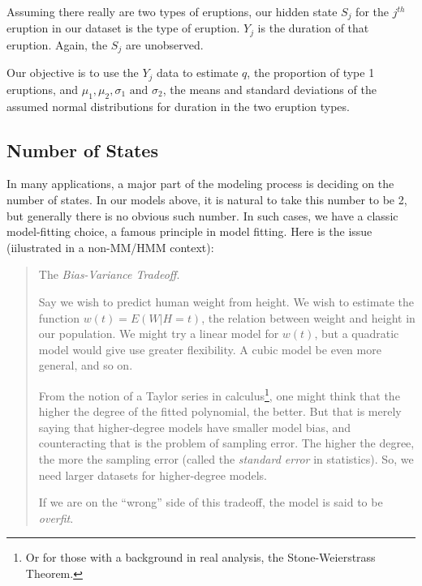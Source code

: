 \documentclass[11pt]{article}
\begin{document}
Assuming there really are two types of eruptions, our hidden state $S_j$
for the $j^{th}$ eruption in our dataset is the type of eruption.  $Y_j$
is the duration of that eruption.  Again, the $S_j$ are unobserved.

Our objective is to use the $Y_j$ data to estimate $q$, the proportion
of type 1 eruptions, and
$
\mu_1,
\mu_2,
\sigma_1 
\textrm{ and }
\sigma_2 
$, the means and standard deviations of the assumed normal distributions
for duration in the two eruption types.

% 
% 

\subsection{Number of States}

In many applications, a major part of the modeling process is deciding
on the number of states.  In our models above, it is natural to take
this number to be 2, but generally there is no obvious such number.  In
such cases, we have a classic model-fitting choice, a famous principle
in model fitting.  Here is the issue (iilustrated in a non-MM/HMM
context):

\begin{quote}

The \textit{Bias-Variance Tradeoff}.  

Say we wish to predict human weight from height.  We wish to estimate
the function $w(t) = E(W | H = t)$, the relation between weight and
height in our population.  We might try a linear model for $w(t)$, but a
quadratic model would give use greater flexibility.  A cubic model be
even more general, and so on.

From the notion of a Taylor series in calculus\footnote{Or for those
with a background in real analysis, the Stone-Weierstrass Theorem.},
one might think that the higher the degree of the fitted polynomial, the
better.  But that is merely saying that higher-degree models have
smaller model bias, and counteracting that is the problem of sampling
error.  The higher the degree, the more the sampling error (called the
\textit{standard error} in statistics).  So, we need larger datasets
for higher-degree models.

If we are on the ``wrong'' side of this tradeoff, the model is said to
be \textit{overfit}.

\end{quote}
\end{document}
